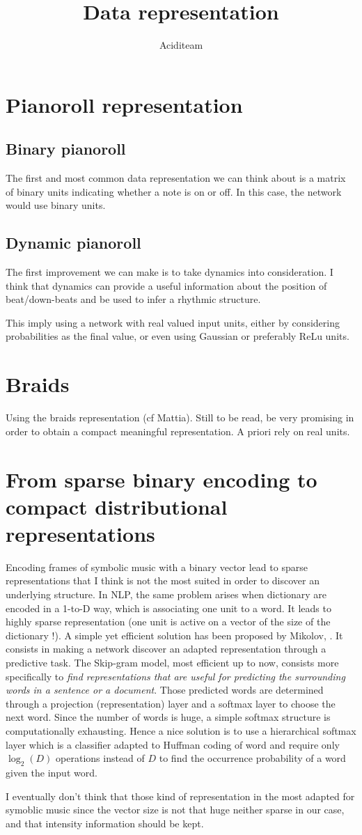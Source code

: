 \documentclass{report}
\title{Data representation}
\author{Aciditeam}
\begin{document}
\maketitle

\section{Pianoroll representation}
\subsection{Binary pianoroll}
The first and most common data representation we can think about is a matrix of binary units indicating whether a note is on or off. In this case, the network would use binary units.

\subsection{Dynamic pianoroll}
The first improvement we can make is to take dynamics into consideration. I think that dynamics can provide a useful information about the position of beat/down-beats and be used to infer a rhythmic structure.

This imply using a network with real valued input units, either by considering probabilities as the final value, or even using Gaussian or preferably ReLu units.

\section{Braids}
Using the braids representation (cf Mattia).
Still to be read, be very promising in order to obtain a compact meaningful representation. A priori rely on real units.

\section{From sparse binary encoding to compact distributional representations}
Encoding frames of symbolic music with a binary vector lead to sparse representations that I think is not the most suited in order to discover an underlying structure. In \gls*{NLP}, the same problem arises when dictionary are encoded in a 1-to-D way, which is associating one unit to a word. It leads to highly sparse representation (one unit is active on a vector of the size of the dictionary !). A simple yet efficient solution has been proposed by Mikolov, \cite{mikolov2013efficient,mikolov2013distributed}. It consists in making a network discover an adapted representation through a predictive task. The Skip-gram model, most efficient up to now, consists more specifically to \textit{find representations that are useful for predicting the surrounding words in a sentence or a document}.
Those predicted words are determined through a projection (representation) layer and a softmax layer to choose the next word. Since the number of words is huge, a simple softmax structure is computationally exhausting. Hence a nice solution is to use a hierarchical softmax layer which is a classifier adapted to Huffman coding of word and require only $\log_{2}(D)$ operations instead of $D$ to find the occurrence probability of a word given the input word.

I eventually don't think that those kind of representation in the most adapted for symoblic music since the vector size is not that huge neither sparse in our case, and that intensity information should be kept.
\end{document}
